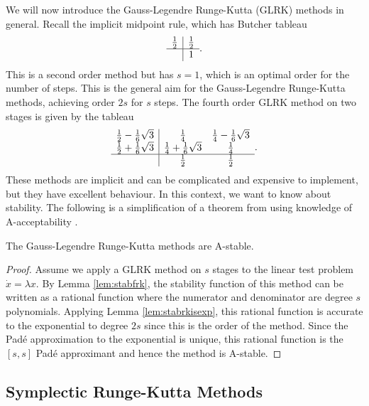 We will now introduce the Gauss-Legendre Runge-Kutta (GLRK) methods in general.
Recall the implicit midpoint rule, which has Butcher tableau
\begin{equation*}
	\begin{array}{c|c}
		\frac{1}{2} & \frac{1}{2} \\
		\hline	
		& 1
	\end{array}.
\end{equation*}
This is a second order method but has $s=1$, which is an optimal order for the number of steps.
This is the general aim for the Gauss-Legendre Runge-Kutta methods, achieving order $2s$ for $s$ steps.
The fourth order GLRK method on two stages is given by the tableau
\begin{equation*}
	\begin{array}{c|cc}
		\frac{1}{2} - \frac{1}{6}\sqrt{3}  &\frac{1}{4} &\frac{1}{4} - \frac{1}{6}\sqrt{3} \\
		\frac{1}{2} + \frac{1}{6}\sqrt{3}  &\frac{1}{4} + \frac{1}{6}\sqrt{3} &\frac{1}{4} \\
		\hline
		&\frac{1}{2} &\frac{1}{2}
	\end{array}.
\end{equation*}
These methods are implicit and can be complicated and expensive to implement, but they have excellent behaviour.
In this context, we want to know about stability.
The following is a simplification of a theorem from \cite{iserles2009rk} using knowledge of A-acceptability \cite{wanner1978order}.
\begin{theorem}
	The Gauss-Legendre Runge-Kutta methods are A-stable.
\end{theorem}
\begin{proof}
	Assume we apply a GLRK method on $s$ stages to the linear test problem $\dot{x} = \lambda x$.
	By Lemma \ref{lem:stabfrk}, the stability function of this method can be written as a rational function where the numerator and denominator are degree $s$ polynomials.
	Applying Lemma \ref{lem:stabrkisexp}, this rational function is accurate to the exponential to degree $2s$ since this is the order of the method.
	Since the Pad\'e approximation to the exponential is unique, this rational function is the $[s,s]$ Pad\'e approximant and hence the method is A-stable.
\end{proof}

\subsection{Symplectic Runge-Kutta Methods}

